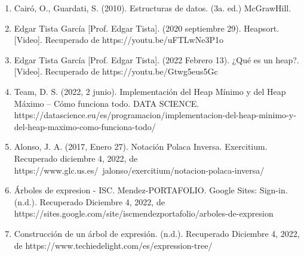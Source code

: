 \documentclass{article}
\begin{document}
\begin{enumerate}
    \item Cairó, O., Guardati, S. (2010). Estructuras de datos. (3a. ed.) McGrawHill.
    \item Edgar Tista García [Prof. Edgar Tista]. (2020 septiembre 29). Heapsort. [Video]. Recuperado de https://youtu.be/uFTLwNe3P1o
    \item Edgar Tista García [Prof. Edgar Tista]. (2022 Febrero 13). ¿Qué es un heap?. [Video]. Recuperado de https://youtu.be/Gtwg5eus5Gc
    \item Team, D. S. (2022, 2 junio). Implementación del Heap Mínimo y del Heap Máximo – Cómo funciona todo. DATA SCIENCE. https://datascience.eu/es/programacion/implementacion-del-heap-minimo-y-del-heap-maximo-como-funciona-todo/
    \item Alonso, J. A. (2017, Enero 27). Notación Polaca Inversa. Exercitium. Recuperado diciembre 4, 2022, de https://www.glc.us.es/~jalonso/exercitium/notacion-polaca-inversa/
    \item Árboles de expresion - ISC. Mendez-PORTAFOLIO. Google Sites: Sign-in. (n.d.). Recuperado Diciembre 4, 2022, de https://sites.google.com/site/iscmendezportafolio/arboles-de-expresion
    \item Construcción de un árbol de expresión. (n.d.). Recuperado Diciembre 4, 2022, de https://www.techiedelight.com/es/expression-tree/

    
\end{enumerate}
\end{document}
